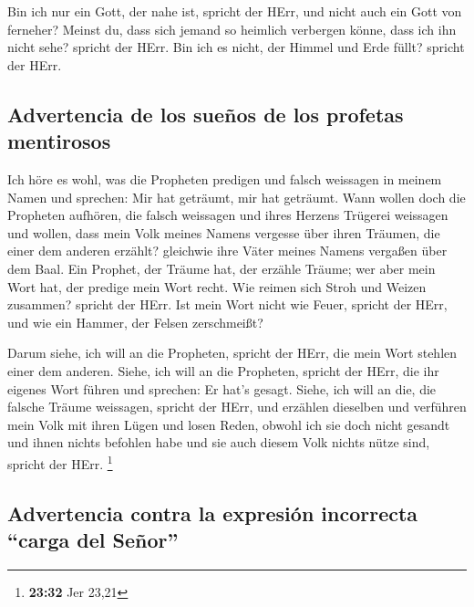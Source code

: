  Bin ich nur ein Gott, der nahe ist, spricht der HErr,
und nicht auch ein Gott von ferneher?  Meinst du, dass
sich jemand so heimlich verbergen könne, dass ich ihn nicht sehe?
spricht der HErr. Bin ich es nicht, der Himmel und Erde füllt? spricht
der HErr.

\hypertarget{advertencia-de-los-sueuxf1os-de-los-profetas-mentirosos}{%
\subsection{Advertencia de los sueños de los profetas
mentirosos}\label{advertencia-de-los-sueuxf1os-de-los-profetas-mentirosos}}

 Ich höre es wohl, was die Propheten predigen und falsch
weissagen in meinem Namen und sprechen: Mir hat geträumt, mir hat
geträumt.  Wann wollen doch die Propheten aufhören, die
falsch weissagen und ihres Herzens Trügerei weissagen 
und wollen, dass mein Volk meines Namens vergesse über ihren Träumen,
die einer dem anderen erzählt? gleichwie ihre Väter meines Namens
vergaßen über dem Baal.  Ein Prophet, der Träume hat, der
erzähle Träume; wer aber mein Wort hat, der predige mein Wort recht. Wie
reimen sich Stroh und Weizen zusammen? spricht der HErr. 
Ist mein Wort nicht wie Feuer, spricht der HErr, und wie ein Hammer, der
Felsen zerschmeißt?

 Darum siehe, ich will an die Propheten, spricht der
HErr, die mein Wort stehlen einer dem anderen.  Siehe,
ich will an die Propheten, spricht der HErr, die ihr eigenes Wort führen
und sprechen: Er hat's gesagt.  Siehe, ich will an die,
die falsche Träume weissagen, spricht der HErr, und erzählen dieselben
und verführen mein Volk mit ihren Lügen und losen Reden, obwohl ich sie
doch nicht gesandt und ihnen nichts befohlen habe und sie auch diesem
Volk nichts nütze sind, spricht der HErr. \footnote{\textbf{23:32} Jer
  23,21}

\hypertarget{advertencia-contra-la-expresiuxf3n-incorrecta-carga-del-seuxf1or}{%
\subsection{Advertencia contra la expresión incorrecta ``carga del
Señor''}\label{advertencia-contra-la-expresiuxf3n-incorrecta-carga-del-seuxf1or}}


